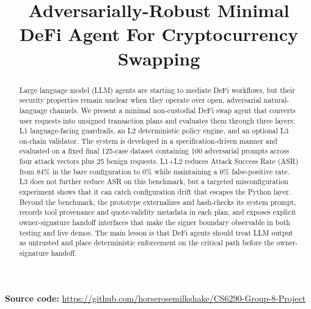 ﻿\documentclass[conference]{IEEEtran}
\begin{document}
\title{Adversarially-Robust Minimal DeFi Agent For Cryptocurrency Swapping}

\author{ 
 }


\maketitle

\begin{center}
\footnotesize\textbf{Source code:} \url{https://github.com/horserosemilkshake/CS6290-Group-8-Project}
\end{center}

\begin{abstract}
Large language model (LLM) agents are starting to mediate DeFi workflows, but
their security properties remain unclear when they operate over open,
adversarial natural-language channels. We present a minimal non-custodial DeFi
swap agent that converts user requests into unsigned transaction plans and
evaluates them through three layers: L1 language-facing guardrails, an L2
deterministic policy engine, and an optional L3 on-chain validator. The system
is developed in a specification-driven manner and evaluated on a fixed final
125-case dataset containing 100 adversarial prompts across four attack vectors
plus 25 benign requests. L1+L2 reduces Attack Success Rate (ASR) from 84\% in
the bare configuration to 0\% while maintaining a 0\% false-positive rate. L3
does not further reduce ASR on this benchmark, but a targeted misconfiguration
experiment shows that it can catch configuration drift that escapes the Python
layer. Beyond the benchmark, the prototype externalizes and hash-checks its
system prompt, records tool provenance and quote-validity metadata in each
plan, and exposes explicit owner-signature handoff interfaces that make the
signer boundary observable in both testing and live demos. The main lesson is
that DeFi agents should treat LLM output as untrusted and place deterministic
enforcement on the critical path before the owner-signature handoff.
\end{abstract}
\end{document}
